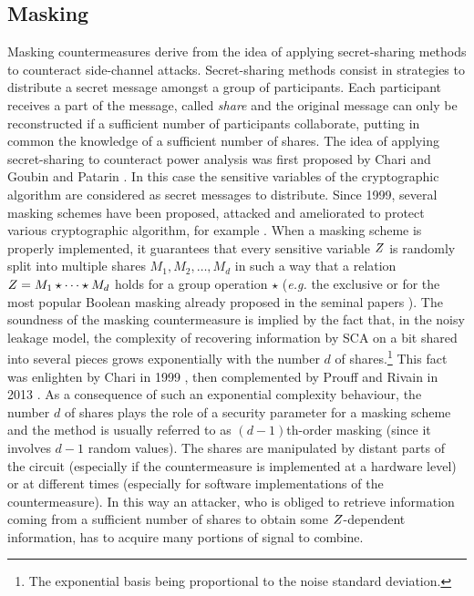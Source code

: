 \subsection{Masking}\label{sec:masking}
Masking countermeasures derive from the idea of applying secret-sharing methods to counteract side-channel attacks. Secret-sharing methods consist in strategies to distribute a secret message amongst a group of participants. Each participant receives a part of the message, called \emph{share} and the original message can only be reconstructed if a sufficient number of participants collaborate, putting in common the knowledge of a sufficient number of shares. The idea of applying secret-sharing to counteract power analysis was first proposed by Chari \etal \cite{chari1999towards} and Goubin and Patarin \cite{goubin1999and}. In this case the sensitive variables of the cryptographic algorithm are considered as secret messages to distribute. Since 1999, several masking schemes have been proposed, attacked and ameliorated to protect various cryptographic algorithm, for example \cite{messerges2000securing,akkar2001implementation,ishai2003private,blomer2004provably,oswald2005side,schramm2006higher,rivain2010provably,moradi2011pushing,coron2013higher,bilgin2014more,de2015higher,goudarzi2017fast,journault2017very}. When a masking scheme is properly implemented, it guarantees that every sensitive variable $Z$ is randomly split  into multiple shares $M_1,M_2,\dots,M_d$ in such a way that a relation $Z = M_1 \star \dots \star M_d$ holds for a group operation $\star$ (\emph{e.g.} the exclusive or for the most popular Boolean masking already proposed in the seminal papers \cite{chari1999towards,goubin1999and}). The soundness of the masking countermeasure is implied by the fact that, in the noisy leakage model, the complexity of recovering information by SCA on a bit shared into several pieces grows exponentially with the number $d$ of shares.\footnote{The exponential basis being proportional to the noise standard deviation.} This fact was enlighten by Chari \etal in 1999  \cite{chari1999towards}, then complemented by Prouff and Rivain in 2013 \cite{prouff2013masking}. As a consequence of such an exponential complexity behaviour, the number $d$ of shares plays the role of a security parameter for a masking scheme and the method is usually referred to as $(d-1)$th-order masking (since it involves $d-1$ random values). The shares are manipulated by distant parts of the circuit (especially if the countermeasure is implemented at a hardware level) or at different times (especially for software implementations of the countermeasure). In this way an attacker, who is obliged to retrieve information coming from a sufficient number of shares to obtain some $Z$-dependent information, has to acquire many portions of signal to combine. \\

